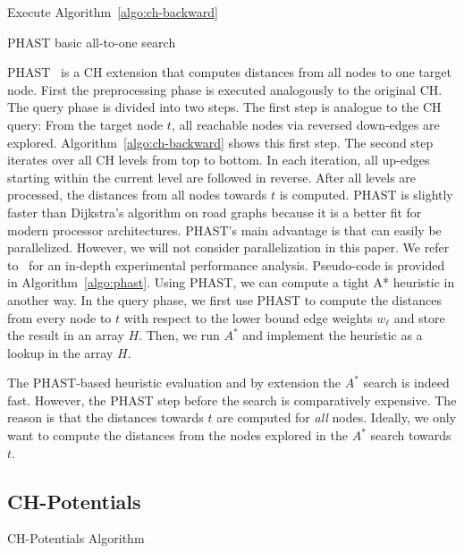 \documentclass[letterpaper]{article} %
\begin{document}
\begin{algorithm2e}
Execute Algorithm~\ref{algo:ch-backward}\;
\caption{PHAST basic all-to-one search}
\label{algo:phast}
\end{algorithm2e}

PHAST~\cite{dgnw-phast-13} is a CH extension that computes distances from all nodes to one target node.
First the preprocessing phase is executed analogously to the original CH.
The query phase is divided into two steps.
The first step is analogue to the CH query:
From the target node $t$, all reachable nodes via reversed down-edges are explored.
Algorithm~\ref{algo:ch-backward} shows this first step.
The second step iterates over all CH levels from top to bottom.
In each iteration, all up-edges starting within the current level are followed in reverse.
After all levels are processed, the distances from all nodes towards $t$ is computed.
PHAST is slightly faster than Dijkstra's algorithm on road graphs because it is a better fit for modern processor architectures.
PHAST's main advantage is that can easily be parallelized.
However, we will not consider parallelization in this paper.
We refer to~\cite{dgnw-phast-13} for an in-depth experimental performance analysis.
Pseudo-code is provided in Algorithm~\ref{algo:phast}.
Using PHAST, we can compute a tight A* heuristic in another way.
In the query phase, we first use PHAST to compute the distances from every node to $t$ with respect to the lower bound edge weights $w_\ell$ and store the result in an array $H$.
Then, we run $A^*$ and implement the heuristic as a lookup in the array $H$.

The PHAST-based heuristic evaluation and by extension the $A^*$ search is indeed fast.
However, the PHAST step before the search is comparatively expensive.
The reason is that the distances towards $t$ are computed for \emph{all} nodes.
Ideally, we only want to compute the distances from the nodes explored in the $A^*$ search towards $t$.

\subsection{CH-Potentials}

\begin{algorithm2e}
\caption{CH-Potentials Algorithm}
\label{algo:pot}
\end{algorithm2e}
\end{document}
